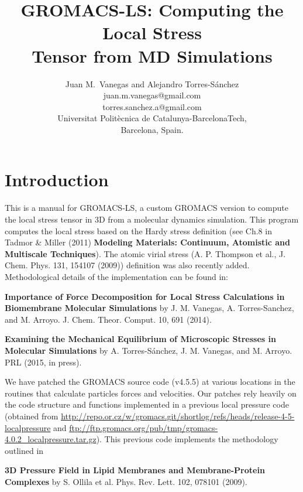 \documentclass[10pt,letterpaper,notitlepage]{article}
\begin{document}
\title{GROMACS-LS: Computing the Local Stress\\Tensor from MD Simulations}
\author{Juan M.~Vanegas and Alejandro Torres-S\'anchez
\\juan.m.vanegas@gmail.com
\\torres.sanchez.a@gmail.com
\\Universitat Polit\`ecnica de Catalunya-BarcelonaTech, \\Barcelona, Spain.}
\maketitle

\section{Introduction}
This is a manual for GROMACS-LS, a custom GROMACS version to compute the local stress tensor in 3D from a molecular dynamics simulation. This program computes the local stress based on the Hardy stress definition (see Ch.8 in Tadmor \& Miller (2011) {\bf Modeling Materials: Continuum, Atomistic and Multiscale Techniques}). The atomic virial stress (A. P. Thompson et al., J. Chem. Phys. 131, 154107 (2009)) definition was also recently added. Methodological details of the implementation can be found in:

{\bf Importance of Force Decomposition for Local Stress Calculations in Biomembrane Molecular Simulations} by J. M. Vanegas, A. Torres-Sanchez, and M. Arroyo. J. Chem. Theor. Comput.  10, 691 (2014). 

{\bf Examining the Mechanical Equilibrium of Microscopic Stresses in Molecular Simulations} by  A. Torres-S\'anchez, J. M. Vanegas, and M. Arroyo. PRL (2015, in press).

We have patched the GROMACS source code (v4.5.5) at various locations in the routines that calculate particles forces and velocities. Our patches rely heavily on the code structure and functions implemented in a previous local pressure code (obtained from \url{http://repo.or.cz/w/gromacs.git/shortlog/refs/heads/release-4-5-localpressure} and \url{ftp://ftp.gromacs.org/pub/tmp/gromacs-4.0.2_localpressure.tar.gz}). This previous code implements the methodology outlined in

{\bf 3D Pressure Field in Lipid Membranes and Membrane-Protein Complexes} by S. Ollila et al. Phys. Rev. Lett. 102, 078101 (2009). 
\end{document}
